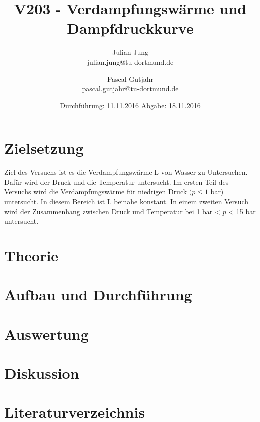 

\title{V203 - Verdampfungswärme und Dampfdruckkurve}
\author{Julian Jung \\ julian.jung@tu-dortmund.de
  \and Pascal Gutjahr \\ pascal.gutjahr@tu-dortmund.de}
  \date{Durchführung: 11.11.2016
  \hspace{3em}
  Abgabe: 18.11.2016}
  
\maketitle
\newpage
\tableofcontents
\newpage
\section{Zielsetzung}
Ziel des Versuchs ist es die Verdampfungswärme L von Wasser zu Untersuchen.
Dafür wird der Druck und die Temperatur untersucht. Im ersten Teil des Versuchs
wird die Verdampfungswärme für niedrigen Druck $(p\le 1$ bar) untersucht. In
diesem Bereich ist L beinahe konstant. In einem zweiten Versuch wird der Zusammenhang
zwischen Druck und Temperatur bei 1 bar < $p$ < 15 bar untersucht.
\section{Theorie}
%
\section{Aufbau und Durchführung}
%
\newpage %
\section{Auswertung}

\section{Diskussion}
%
\section{Literaturverzeichnis}

